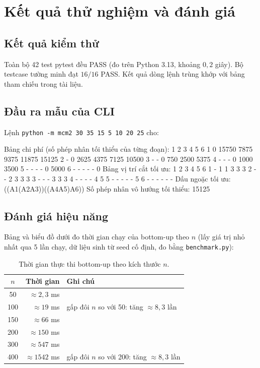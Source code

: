 \documentclass[12pt,a4paper]{article}
\begin{document}
\section{Kết quả thử nghiệm và đánh giá}

\subsection{Kết quả kiểm thử}
Toàn bộ 42 test pytest đều PASS (đo trên Python 3.13, khoảng $0{,}2$ giây). Bộ testcase tường minh đạt $16/16$ PASS. Kết quả dòng lệnh trùng khớp với bảng tham chiếu trong tài liệu.

\subsection{Đầu ra mẫu của CLI}
Lệnh \texttt{python -m mcm2 30 35 15 5 10 20 25} cho:

\begin{VOutput}
Bảng chi phí (số phép nhân tối thiểu của từng đoạn):
              1       2       3       4       5       6
      1       0   15750    7875    9375   11875   15125
      2       -       0    2625    4375    7125   10500
      3       -       -       0     750    2500    5375
      4       -       -       -       0    1000    3500
      5       -       -       -       -       0    5000
      6       -       -       -       -       -       0
Bảng vị trí cắt tối ưu:
      1   2   3   4   5   6
  1   -   1   1   3   3   3
  2   -   -   2   3   3   3
  3   -   -   -   3   3   3
  4   -   -   -   -   4   5
  5   -   -   -   -   -   5
  6   -   -   -   -   -   -
Dấu ngoặc tối ưu: ((A1(A2A3))((A4A5)A6))
Số phép nhân vô hướng tối thiểu: 15125
\end{VOutput}

\subsection{Đánh giá hiệu năng}
Bảng và biểu đồ dưới đo thời gian chạy của bottom-up theo $n$ (lấy giá trị nhỏ nhất qua 5 lần chạy, dữ liệu sinh từ seed cố định, đo bằng \texttt{benchmark.py}):

\begin{table}[H]
\centering
\caption{Thời gian thực thi bottom-up theo kích thước $n$.}
\small
\begin{tabular}{c r l}
\toprule
$n$ & Thời gian & Ghi chú \\
\midrule
50  & $\approx 2{,}3$ ms & \\
100 & $\approx 19$ ms & gấp đôi $n$ so với 50: tăng $\approx 8{,}3$ lần \\
150 & $\approx 66$ ms & \\
200 & $\approx 150$ ms & \\
300 & $\approx 547$ ms & \\
400 & $\approx 1542$ ms & gấp đôi $n$ so với 200: tăng $\approx 8{,}3$ lần \\
\bottomrule
\end{tabular}
\end{table}
\end{document}
